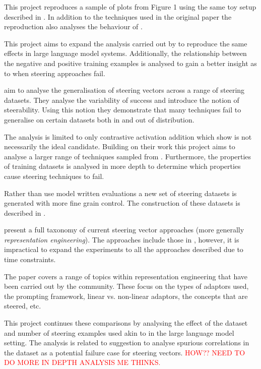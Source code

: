 This project reproduces a sample of plots from Figure 1 using the same toy setup described in .
In addition to the techniques used in the original paper the reproduction also analyses the behaviour of \citet{ace}.

This project aims to expand the analysis carried out by \citet{steering-clear} to reproduce the same effects in large language model systems.
Additionally, the relationship between the negative and positive training examples is analysed to gain a better insight as to when steering approaches fail.

aim to analyse the generalisation of steering vectors across a range of steering datasets.
They analyse the variability of success and introduce the notion of steerability.
Using this notion they demonstrate that many techniques fail to generalise on certain datasets both in and out of distribution.

The analysis is limited to only contrastive activation addition \citep{caa} which \citet{steering-clear} show is not necessarily the ideal candidate.
Building on their work this project aims to analyse a larger range of techniques sampled from \citet{steering-clear}.
Furthermore, the properties of training datasets is analysed in more depth to determine which properties cause steering techniques to fail.

Rather than use model written evaluations \citep{mwe} a new set of steering datasets is generated with more fine grain control.
The construction of these datasets is described in .

present a full taxonomy of current steering vector approaches (more generally \emph{representation engineering}).
The approaches include those in \citet{steering-clear}, however, it is impractical to expand the experiments to all the approaches described due to time constraints.

The paper covers a range of topics within representation engineering that have been carried out by the community.
These focus on the types of adaptors used, the prompting framework, linear vs. non-linear adaptors, the concepts that are steered, etc.

This project continues these comparisons by analysing the effect of the dataset and number of steering examples used akin to \citet{steering-clear} in the large language model setting.
The analysis is related to \cites{steering-taxonomy} suggestion to analyse spurious correlations in the dataset as a potential failure case for steering vectors.
\textcolor{red}{HOW?? NEED TO DO MORE IN DEPTH ANALYSIS ME THINKS.}

